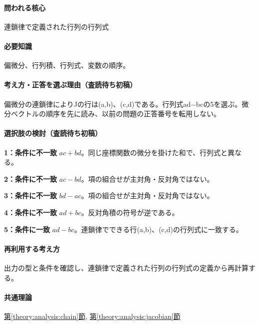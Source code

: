 \paragraph{問われる核心} 連鎖律で定義された行列の行列式

\paragraph{必要知識} 偏微分、行列積、行列式、変数の順序。

\paragraph{考え方・正答を選ぶ理由（査読待ち初稿）} 偏微分の連鎖律によりJの行は(a,b)、(c,d)である。行列式ad−bcの5を選ぶ。微分ベクトルの順序を先に読み、以前の問題の正答番号を転用しない。

\paragraph{選択肢の検討（査読待ち初稿）}\mbox{}\par

\noindent\textbf{1：条件に不一致} \(ac+bd\)。同じ座標関数の微分を掛けた和で、行列式と異なる。\par

\noindent\textbf{2：条件に不一致} \(ac-bd\)。項の組合せが主対角・反対角ではない。\par

\noindent\textbf{3：条件に不一致} \(bd-ac\)。項の組合せが主対角・反対角ではない。\par

\noindent\textbf{4：条件に不一致} \(ad+bc\)。反対角積の符号が逆である。\par

\noindent\textbf{5：条件に一致} \(ad-bc\)。連鎖律でできる行(a,b)、(c,d)の行列式に一致する。\par

\paragraph{再利用する考え方} 出力の型と条件を確認し、連鎖律で定義された行列の行列式の定義から再計算する。

\paragraph{共通理論} \hyperref[theory:analysis:chain]{第\ref*{theory:analysis:chain}節}, \hyperref[theory:analysis:jacobian]{第\ref*{theory:analysis:jacobian}節}

